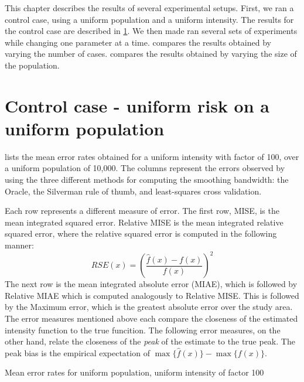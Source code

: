 
This chapter describes the results of several experimental setups.
First, we ran a control case, using a uniform population and a uniform intensity.
The results for the control case are described in \cref{sec:results:unif_100_unif}.
We then made ran several sets of experiments while changing one parameter at a time.
 compares the results obtained by varying the number of cases.
 compares the results obtained by varying the size of the population.


\section{Control case - uniform risk on a uniform population}
\label{sec:results:unif_100_unif}

 lists the mean error rates obtained for a uniform intensity with factor of 100, over a uniform population of 10,000.
The columns represent the errors observed by using the three different methods for computing the smoothing bandwidth:
the Oracle, the Silverman rule of thumb, and least-squares cross validation.

Each row represents a different measure of error.
The first row, MISE, is the mean integrated squared error.
Relative MISE is the mean integrated relative squared error, where the relative squared error is computed in the following manner:
\[ RSE(x) = \left(\frac{\hat{f}(x)-f(x)}{f(x)}\right)^2 \]
The next row is the mean integrated absolute error (MIAE), which is followed by Relative MIAE which is computed analogously to Relative MISE.
This is followed by the Maximum error, which is the greatest absolute error over the study area.
The error measures mentioned above each compare the closeness of the estimated intensity function to the true funcition.
The following error measures, on the other hand, relate the closeness of the \textit{peak} of the estimate to the true peak.
The peak bias is the empirical expectation of \(\max{\{\hat{f}(x)\}} - \max{\{f(x)\}}\).


\begin{table}[H]
\centering

\caption{Mean error rates for uniform population, uniform intensity of factor 100}
\label{tbl:errors:unif_100_unif}
\end{table}

